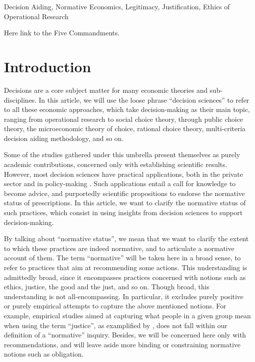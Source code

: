 \documentclass[preprint, french, english, 11pt, authoryear]{elsarticle}%
\begin{document}
\begin{keyword}
Decision Aiding, Normative Economics, Legitimacy, Justification, Ethics of Operational Research
\end{keyword}

\maketitle
Here link to the Five Commandments.

\section{Introduction}
Decisions are a core subject matter for many economic theories and sub-disciplines. In this article, we will use the loose phrase “decision sciences” to refer to all these economic approaches, which take decision-making as their main topic, ranging from operational research to social choice theory, through public choice theory, the microeconomic theory of choice, rational choice theory, multi-criteria decision aiding methodology, and so on.

Some of the studies gathered under this umbrella present themselves as purely academic contributions, concerned only with establishing scientific results. However, most decision sciences have practical applications, both in the private sector and in policy-making \citep{tsoukias_policy_2013,marchi_evidence-based_2016}. Such applications entail a call for knowledge to become advice, and purportedly scientific propositions to endorse the normative status of prescriptions. 
In this article, we want to clarify the normative status of such practices, which consist in using insights from decision sciences to support decision-making.

By talking about “normative status”, we mean that we want to clarify the extent to which these practices are indeed normative, and to articulate a normative account of them. 
The term “normative” will be taken here in a broad sense, to refer to practices that aim at recommending some actions. This understanding is admittedly broad, since it encompasses practices concerned with notions such as ethics, justice, the good and the just, and so on. 
Though broad, this understanding is not all-encompassing. In particular, it excludes purely positive or purely empirical attempts to capture the above mentioned notions. For example, empirical studies aimed at capturing what people in a given group mean when using the term “justice”, as examplified by \citet{gaertner_empirical_2012}, does not fall within our definition of a “normative” inquiry. Besides, we will be concerned here only with recommendations, and will leave aside more binding or constraining normative notions such as obligation.
\end{document}
